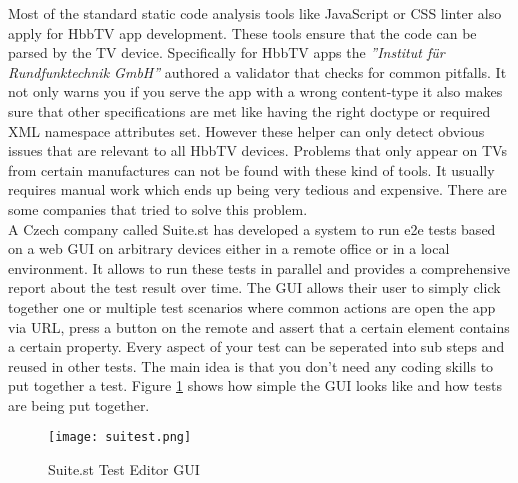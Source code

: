 Most of the standard static code analysis tools like JavaScript or CSS linter also apply for HbbTV app
development. These tools ensure that the code can be parsed by the TV device. Specifically for
HbbTV apps the \textit{''Institut für Rundfunktechnik GmbH''} authored a validator that checks
for common pitfalls. It not only warns you if you serve the app with a wrong content-type
it also makes sure that other specifications are met like having the right doctype or required
XML namespace attributes set. However these helper can only detect obvious issues that are relevant
to all HbbTV devices. Problems that only appear on TVs from certain manufactures can not be found
with these kind of tools. It usually requires manual work which ends up being very tedious and
expensive. There are some companies that tried to solve this problem.\\
A Czech company called Suite.st has developed a system to run e2e tests based on a web GUI on
arbitrary devices either in a remote office or in a local environment. It allows to run these
tests in parallel and provides a comprehensive report about the test result over time. The
GUI allows their user to simply click together one or multiple test scenarios where common
actions are open the app via URL, press a button on the remote and assert that a certain element
contains a certain property. Every aspect of your test can be seperated into sub steps and
reused in other tests. The main idea is that you don't need any coding skills to put together
a test. Figure \ref{fig:suitest} shows how simple the GUI looks like and how tests are being put
together.

\begin{figure}[htb]
  \centering
  \texttt{[image: suitest.png]}\\
  \caption{Suite.st Test Editor GUI}\label{fig:suitest}
\end{figure}

